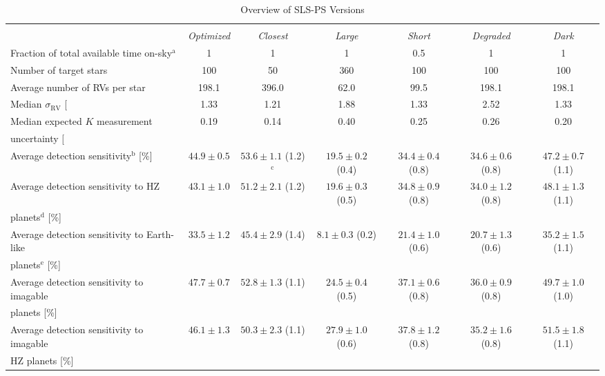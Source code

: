 \clearpage
\begin{landscape}
\begin{table*}
  \small
  \renewcommand{\arraystretch}{0.7}
  \caption{Overview of SLS-PS Versions}
  \label{BStable:summary}
  \begin{tabular}{lcccccc}
     \hline \\ [-1ex]
     & \emph{Optimized} & \emph{Closest} & \emph{Large} & \emph{Short} & \emph{Degraded} & \emph{Dark} \\
     \hline
     Fraction of total available time on-sky$^{\text{a}}$ & 1 & 1 & 1 & 0.5 & 1 & 1 \\    
     Number of target stars & 100 & 50 & 360 & 100 & 100 & 100 \\
     Average number of RVs per star & 198.1 & 396.0 & 62.0 & 99.5 & 198.1 & 198.1 \\
     Median $\sigma_{\text{RV}}$ [\mps{]} & 1.33 & 1.21 & 1.88 & 1.33 & 2.52 & 1.33 \\
     Median expected $K$ measurement & 0.19 & 0.14 & 0.40 & 0.25 & 0.26 & 0.20 \\
     uncertainty $[$\mps{$]$} &&&&&& \\
     \hline
     Average detection sensitivity$^{\text{b}}$ [\%] & $44.9 \pm 0.5$ & $53.6 \pm 1.1$ (1.2)$^{\text{c}}$ & $19.5 \pm 0.2$ (0.4) & $34.4 \pm 0.4$ (0.8) & $34.6 \pm 0.6$ (0.8) & $47.2 \pm 0.7$ (1.1) \\
     Average detection sensitivity to HZ  & $43.1 \pm 1.0$ & $51.2 \pm 2.1$ (1.2) & $19.6 \pm 0.3$ (0.5) & $34.8 \pm 0.9$ (0.8) & $34.0 \pm 1.2$ (0.8) & $48.1 \pm 1.3$ (1.1) \\
     planets$^{\text{d}}$ [\%] &&&&&& \\
     Average detection sensitivity to Earth-like & $33.5 \pm 1.2$ & $45.4 \pm 2.9$ (1.4) & $8.1 \pm 0.3$ (0.2) & $21.4 \pm 1.0$ (0.6) & $20.7 \pm 1.3$ (0.6) & $35.2 \pm 1.5$ (1.1) \\
     planets$^{\text{e}}$ [\%] &&&&&& \\
     Average detection sensitivity to imagable & $47.7 \pm 0.7$ & $52.8 \pm 1.3$ (1.1) & $24.5 \pm 0.4$ (0.5) & $37.1 \pm 0.6$ (0.8) & $36.0 \pm 0.9$ (0.8) & $49.7 \pm 1.0$ (1.0) \\
     planets [\%] &&&&&& \\
     Average detection sensitivity to imagable  & $46.1 \pm 1.3$ & $50.3 \pm 2.3$ (1.1) & $27.9 \pm 1.0$ (0.6) & $37.8 \pm 1.2$ (0.8) & $35.2 \pm 1.6$ (0.8) & $51.5 \pm 1.8$ (1.1)  \\
     HZ planets [\%] &&&&&& \\

\end{tabular}
\end{table*}
\end{landscape}
